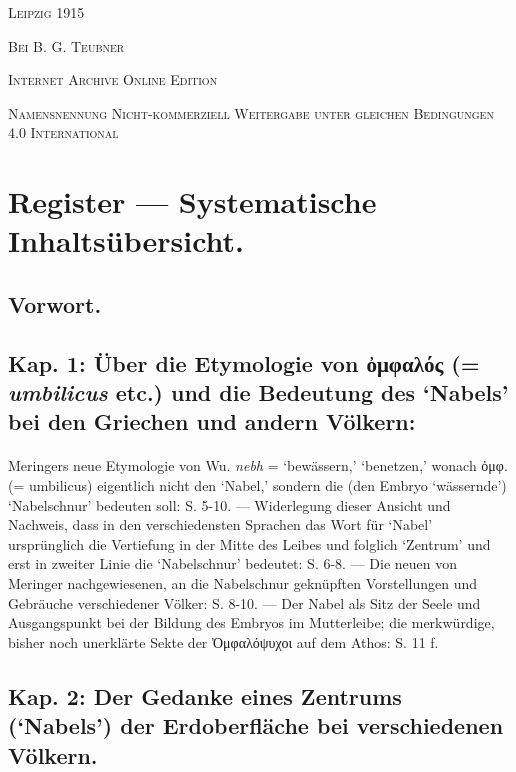 \documentclass[a4paper, 11pt, oneside]{article}
\begin{document}
\begin{titlepage}
	\vspace{1\baselineskip}

        \vspace*{\fill}

	{\small\scshape Leipzig 1915}
	
	{\small\scshape{Bei B. G. Teubner}}
 
	\vspace{0.5\baselineskip} %

        \scshape Internet Archive Online Edition  %
	
	{\scshape\small Namensnennung Nicht-kommerziell Weitergabe unter gleichen Bedingungen 4.0 International} %
\end{titlepage}
\setlength{\parskip}{1mm plus1mm minus1mm}
\clearpage
\tableofcontents
\clearpage
\section*{Register --- Systematische Inhaltsübersicht.}
\subsection*{Vorwort.}
\subsection*{Kap. 1: Über die Etymologie von ὀμφαλός (= \emph{umbilicus} etc.) und die Bedeutung des `Nabels' bei den Griechen und andern Völkern:}
\paragraph{}
Meringers neue Etymologie von Wu. \emph{nebh} = `bewässern,' `benetzen,' wonach ὀμφ. (= umbilicus) eigentlich nicht den `Nabel,' sondern die (den Embryo `wässernde') `Nabelschnur' bedeuten soll: S. 5-10. --- Widerlegung dieser Ansicht und Nachweis, dass in den verschiedensten Sprachen das Wort für `Nabel' ursprünglich die Vertiefung in der Mitte des Leibes und folglich `Zentrum' und erst in zweiter Linie die `Nabelschnur' bedeutet: S. 6-8. --- Die neuen von Meringer nachgewiesenen, an die Nabelschnur geknüpften Vorstellungen und Gebräuche verschiedener Völker: S. 8-10. --- Der Nabel als Sitz der Seele und Ausgangspunkt bei der Bildung des Embryos im Mutterleibe; die merkwürdige, bisher noch unerklärte Sekte der Ὀμφαλόψυχοι auf dem Athos: S. 11 f.

\subsection*{Kap. 2: Der Gedanke eines Zentrums (`Nabels') der Erdoberfläche bei verschiedenen Völkern.}
\end{document}
